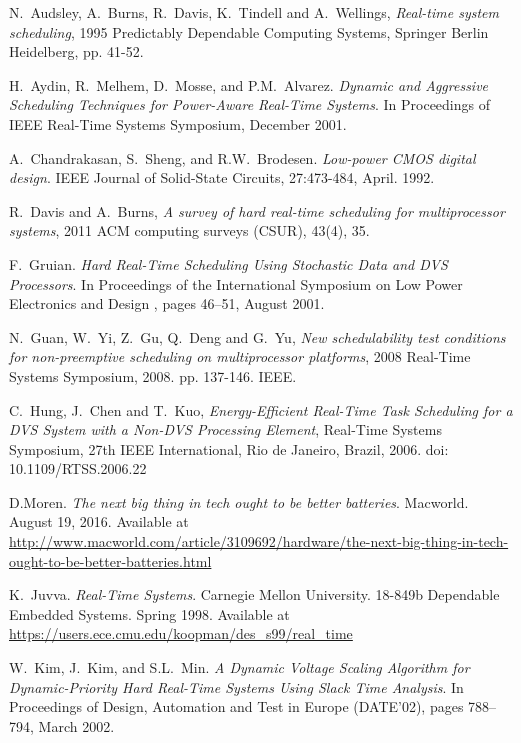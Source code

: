 \documentclass[10pt,article]{IEEEtran}
\begin{document}
\begin{thebibliography}{1}

N.~Audsley, A.~Burns, R.~Davis, K.~Tindell and A.~Wellings, \emph{Real-time system scheduling}, 1995 Predictably Dependable Computing Systems, Springer Berlin Heidelberg, pp. 41-52.

H.~Aydin, R.~Melhem, D.~Mosse, and P.M.~Alvarez. \emph{Dynamic  and  Aggressive  Scheduling  Techniques  for  Power-Aware  Real-Time Systems}. In Proceedings  of IEEE Real-Time Systems Symposium, December 2001.

A.~Chandrakasan, S.~Sheng, and R.W.~Brodesen. \emph{Low-power CMOS digital design}. IEEE Journal of Solid-State Circuits, 27:473-484, April. 1992.

R.~Davis and A.~Burns, \emph{A survey of hard real-time scheduling for multiprocessor systems}, 2011 ACM computing surveys (CSUR), 43(4), 35.

F.~Gruian. \emph{Hard Real-Time Scheduling Using Stochastic Data and  DVS  Processors}. In Proceedings  of  the  International Symposium on Low Power Electronics and Design , pages 46–51, August 2001.

N.~Guan, W.~Yi, Z.~Gu, Q.~Deng and G.~Yu, \emph{New schedulability test conditions for non-preemptive scheduling on multiprocessor platforms}, 2008 Real-Time Systems Symposium, 2008. pp. 137-146. IEEE.

C.~Hung, J.~Chen and T.~Kuo, \emph{Energy-Efficient Real-Time Task Scheduling for a DVS System with a Non-DVS Processing Element},  Real-Time Systems Symposium, 27th IEEE International, Rio de Janeiro, Brazil, 2006. doi: 10.1109/RTSS.2006.22

D.Moren. \emph{The next big thing in tech ought to be better batteries}. Macworld. August 19, 2016. Available at \url{http://www.macworld.com/article/3109692/hardware/the-next-big-thing-in-tech-ought-to-be-better-batteries.html}

K.~Juvva. \emph{Real-Time Systems}. Carnegie Mellon University. 18-849b Dependable Embedded Systems. Spring 1998. Available at \url{https://users.ece.cmu.edu/koopman/des_s99/real_time}

W.~Kim, J.~Kim, and S.L.~Min. \emph{A Dynamic Voltage Scaling  Algorithm  for  Dynamic-Priority  Hard  Real-Time  Systems Using Slack Time Analysis}. In Proceedings of Design, Automation and Test in Europe (DATE'02), pages 788–794, March 2002.


\end{thebibliography}
\end{document}

